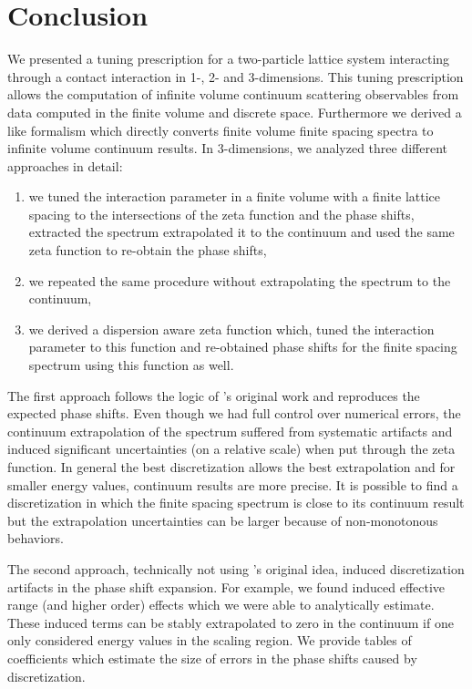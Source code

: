 \section{Conclusion}\label{sec:conclusion}

We presented a tuning prescription for a two-particle lattice system interacting through a contact interaction in 1-, 2- and 3-dimensions.
This tuning prescription allows the computation of infinite volume continuum scattering observables from data computed in the finite volume and discrete space.
Furthermore we derived a \Luscher like formalism which directly converts finite volume finite spacing spectra to infinite volume continuum results.
In 3-dimensions, we analyzed three different approaches in detail:
\begin{enumerate}
	\item we tuned the interaction parameter in a finite volume with a finite lattice spacing to the intersections of the \Luscher zeta function and the phase shifts, extracted the spectrum extrapolated it to the continuum and used the same \Luscher zeta function to re-obtain the phase shifts,
	\item we repeated the same procedure without extrapolating the spectrum to the continuum,
	\item we derived a dispersion aware zeta function which, tuned the interaction parameter to this function and re-obtained phase shifts for the finite spacing spectrum using this function as well.
\end{enumerate}

The first approach follows the logic of \Luscher's original work and reproduces the expected phase shifts.
Even though we had full control over numerical errors, the continuum extrapolation of the spectrum suffered from systematic artifacts and induced significant uncertainties (on a relative scale) when put through the zeta function.
In general the best discretization allows the best extrapolation and for smaller energy values, continuum results are more precise.
It is possible to find a discretization in which the finite spacing spectrum is close to its continuum result but the extrapolation uncertainties can be larger because of non-monotonous behaviors.

The second approach, technically not using \Luscher's original idea, induced discretization artifacts in the phase shift expansion.
For example, we found induced effective range (and higher order) effects which we were able to analytically estimate.
These induced terms can be stably extrapolated to zero in the continuum if one only considered energy values in the scaling region.
We provide tables of coefficients which estimate the size of errors in the phase shifts caused by discretization.

